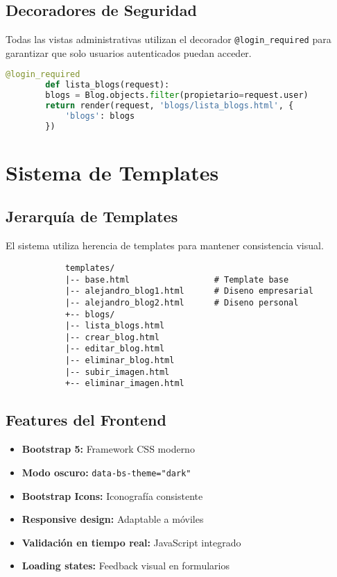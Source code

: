 \documentclass[11pt,a4paper]{report}
\begin{document}
	\subsection{Decoradores de Seguridad}
	Todas las vistas administrativas utilizan el decorador \texttt{@login\_required} para garantizar que solo usuarios autenticados puedan acceder.
	
	\begin{lstlisting}[language=python]
		@login_required
		def lista_blogs(request):
		blogs = Blog.objects.filter(propietario=request.user)
		return render(request, 'blogs/lista_blogs.html', {
			'blogs': blogs
		})
	\end{lstlisting}
	
	\section{Sistema de Templates}
	
	\subsection{Jerarquía de Templates}
	El sistema utiliza herencia de templates para mantener consistencia visual.
	
	\begin{tcolorbox}[colback=yellow!5!white,colframe=yellow!75!black,title=Estructura de Templates]
		\begin{verbatim}
			templates/
			|-- base.html                 # Template base
			|-- alejandro_blog1.html      # Diseno empresarial
			|-- alejandro_blog2.html      # Diseno personal
			+-- blogs/
			|-- lista_blogs.html
			|-- crear_blog.html
			|-- editar_blog.html
			|-- eliminar_blog.html
			|-- subir_imagen.html
			+-- eliminar_imagen.html
		\end{verbatim}
	\end{tcolorbox}
	
	\subsection{Features del Frontend}
	\begin{itemize}
		\item \textbf{Bootstrap 5:} Framework CSS moderno
		\item \textbf{Modo oscuro:} \texttt{data-bs-theme="dark"}
		\item \textbf{Bootstrap Icons:} Iconografía consistente
		\item \textbf{Responsive design:} Adaptable a móviles
		\item \textbf{Validación en tiempo real:} JavaScript integrado
		\item \textbf{Loading states:} Feedback visual en formularios
	\end{itemize}
	
\end{document}
